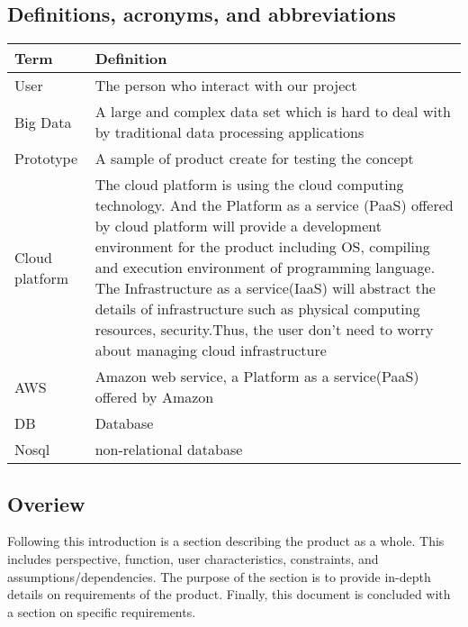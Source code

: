 \documentclass[letterpaper,10pt]{article}
\begin{document}
        \subsection{Definitions, acronyms, and abbreviations} 
        \begin{tabu} to 
        \hline
        Term & Definition \\
        \hline
        User & The person who interact with our project \\
        \hline
        Big Data & A large and complex data set which is hard to deal with by traditional data processing applications\\
        \hline
        Prototype & A sample of product create for testing the concept \\
        \hline
        Cloud platform & The cloud platform is using the cloud computing technology. And the Platform as a service (PaaS) offered by cloud platform will provide a development environment for the product including OS, compiling and  execution environment of programming language. The Infrastructure as a service(IaaS) will abstract the details of infrastructure such as physical computing resources, security.Thus, the user don’t need to worry about managing cloud infrastructure \\
        \hline
        AWS & Amazon web service, a Platform as a service(PaaS) offered by Amazon \\
        \hline
        DB & Database \\
        \hline
        Nosql & non-relational database \\
        \hline
        \end{tabu}
        
     
        \subsection{Overiew}
        Following this introduction is a section describing the product as a whole. This includes perspective, function, user characteristics, constraints, and assumptions/dependencies. The purpose of the section is to provide in-depth details on requirements of the product. Finally, this document is concluded with a section on specific requirements.
    
\end{document}
